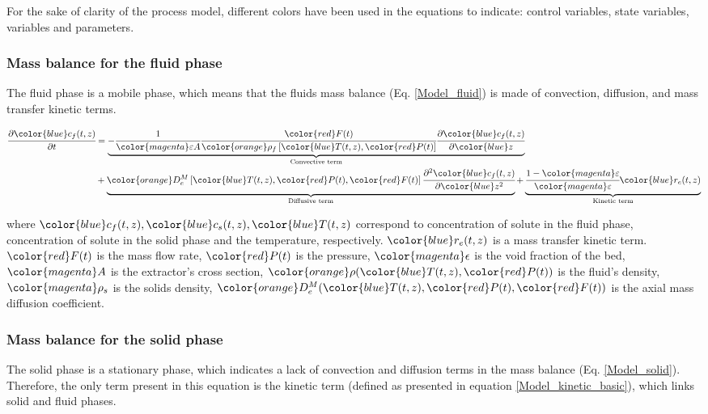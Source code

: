 \documentclass[a4paper,fleqn]{cas-dc}
\begin{document}
For the sake of clarity of the process model, different colors have been used in the equations to indicate: 
{\color{red}control variables},
{\color{blue}state variables},
{\color{orange}variables} and
{\color{magenta}parameters}.

\subsubsection{Mass balance for the fluid phase} \label{CH: Mass_balance_fluid}
The fluid phase is a mobile phase, which means that the fluids mass balance (Eq. \ref{Model_fluid}) is made of convection, diffusion, and mass transfer kinetic terms.

{\footnotesize
		\begin{align} 
			\label{Model_fluid}
			\cfrac{\partial {\color{blue}c_f}(t,z)}{\partial t} &	=  \underbrace{-\cfrac{1}{ {\color{magenta}\varepsilon A}}\cfrac{{\color{red}F}(t)}{{\color{orange}\rho_f}\left[{\color{blue}T}(t,z),{\color{red}P}(t)\right]} \cfrac{\partial {\color{blue}c_f}(t,z)}{\partial {\color{blue}z}}}_{\text{Convective term}} \\
			&+ \underbrace{ {\color{orange}D^M_e}\left[{\color{blue}T}(t,z),{\color{red}P}(t),{\color{red}F}(t)\right] \cfrac{\partial^2 {\color{blue}c_f}(t,z)}{\partial {\color{blue}z^2}} }_{\text{Diffusive term}} 
			+ \underbrace{ \cfrac{1-{\color{magenta}\varepsilon}}{{\color{magenta}\varepsilon}} {\color{blue}r_e}(t,z) }_{\text{Kinetic term}} 
		\end{align} }

where ${\color{blue}c_f}(t,z), {\color{blue}c_s}(t,z), {\color{blue}T}(t,z)$ correspond to concentration of solute in the fluid phase, concentration of solute in the solid phase and the temperature, respectively. ${\color{blue}r_e}(t,z)$ is a mass transfer kinetic term. ${\color{red}F}(t)$ is the mass flow rate, ${\color{red}P}(t)$ is the pressure, ${\color{magenta}\epsilon}$ is the void fraction of the bed, ${\color{magenta}A}$ is the extractor’s cross section, ${\color{orange}\rho}({\color{blue}T}(t,z),{\color{red}P}(t))$ is the fluid's density, ${\color{magenta}\rho_s}$ is the solids density, ${\color{orange}D^M_e}({\color{blue}T}(t,z),{\color{red}P}(t),{\color{red}F}(t))$ is the axial mass diffusion coefficient.

\subsubsection{Mass balance for the solid phase} \label{Mass_balance_solid}
The solid phase is a stationary phase, which indicates a lack of convection and diffusion terms in the mass balance (Eq.  \ref{Model_solid}). Therefore, the only term present in this equation is the kinetic term (defined as presented in equation \ref{Model_kinetic_basic}), which links solid and fluid phases.
\end{document}
